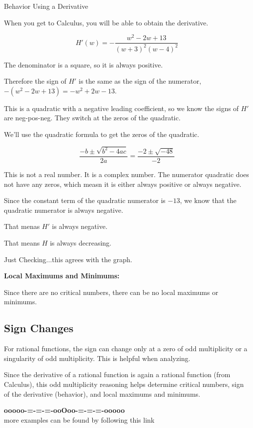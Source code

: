\documentclass{ximera}
\begin{document}
\begin{example} Behavior Using a Derivative

When you get to Calculus, you will be able to obtain the derivative.

\[  H'(w) = -\frac{w^2 - 2w + 13}{(w+3)^2 (w-4)^2}  \]

The denominator is a square, so it is always positive.

Therefore the sign of $H'$ is the same as the sign of the numerator, $-(w^2 - 2w + 13) = -w^2 + 2w - 13$.

This is a quadratic with a negative leading coefficient, so we know the signs of $H'$ are neg-pos-neg.  They switch at the zeros of the quadratic.

We'll use the quadratic formula to get the zeros of the quadratic.

\[
\frac{-b \pm \sqrt{b^2 - 4 a c}}{2a} = \frac{-2 \pm \sqrt{-48}}{-2}
\]

This is not a real number. It is a complex number.  The numerator quadratic does not have any zeros, which measn it is either always positive or always negative.

Since the constant term of the quadratic numerator is $-13$, we know that the quadratic numerator is always negative.

That menas $H'$ is always negative.

That means $H$ is always decreasing.

Just Checking...this agrees with the graph.

\textbf{Local Maximums and Minimums:}

Since there are no critical numbers, there can be no local maximums or minimums.


\end{example}


\subsection*{Sign Changes}

For rational functions, the sign can change only at a zero of odd multiplicity or a singularity of odd multiplicity. This is helpful when analyzing. 


Since the derivative of a rational function is again a rational function (from Calculus), this odd multiplicity reasoning helps determine critical numbers, sign of the derivative (behavior), and local maximums and minimums.



















\begin{center}
\textbf{\textcolor{green!50!black}{ooooo-=-=-=-ooOoo-=-=-=-ooooo}} \\

more examples can be found by following this link\\ 

\end{center}
\end{document}
